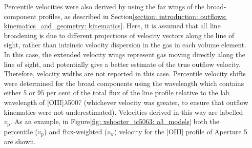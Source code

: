 Percentile velocities were also derived by using the far wings of the broad-component profiles, as described in Section\;\ref{section: introduction: outflows: kinematics_and_geometry: kinematics}. Here, it is assumed that all line broadening is due to different projections of velocity vectors along the line of sight, rather than intrinsic velocity dispersion in the gas in each volume element. In this case, the extended velocity wings represent gas moving directly along the line of sight, and potentially give a better estimate of the true outflow velocity. Therefore, velocity widths are not reported in this case. Percentile velocity shifts were determined for the broad components using the wavelength which contains either 5 or 95 per cent of the total flux of the line profile relative to the lab wavelength of [OIII]$\lambda$5007 (whichever velocity was greater, to ensure that outflow kinematics were not underestimated). Velocities derived in this way are labelled $v_\mathrm{p}$. As an example, in Figure\;\ref{fig: xshooter_ic5063: o3_models} both the percentile ($v_\mathrm{p}$) and flux-weighted ($v_\mathrm{w}$) velocity for the [OIII] profile of Aperture 5 are shown.

